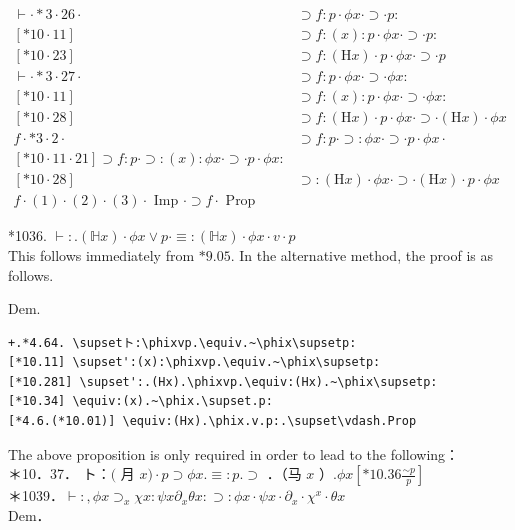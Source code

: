 \documentclass[10pt]{article}
\begin{document}
\[
\begin{array}{ll}
\vdash \cdot * 3 \cdot 26 \cdot & \supset f: p \cdot \phi x \cdot \supset \cdot p: \\
{[* 10 \cdot 11]} & \supset f:(x): p \cdot \phi x \cdot \supset \cdot p: \\
{[* 10 \cdot 23]} & \supset f:(\mathrm{H} x) \cdot p \cdot \phi x \cdot \supset \cdot p \\
\vdash \cdot * 3 \cdot 27 \cdot & \supset f: p \cdot \phi x \cdot \supset \cdot \phi x: \\
{[* 10 \cdot 11]} & \supset f:(x): p \cdot \phi x \cdot \supset \cdot \phi x: \\
{[* 10 \cdot 28]} & \supset f:(\mathrm{H} x) \cdot p \cdot \phi x \cdot \supset \cdot(\mathrm{H} x) \cdot \phi x \\
f \cdot * 3 \cdot 2 \cdot & \supset f: p \cdot \supset: \phi x \cdot \supset \cdot p \cdot \phi x \cdot \\
{[* 10 \cdot 11 \cdot 21] \supset f: p \cdot \supset:(x): \phi x \cdot \supset \cdot p \cdot \phi x:} \\
{[* 10 \cdot 28]} & \supset:(\mathrm{H} x) \cdot \phi x \cdot \supset \cdot(\mathrm{H} x) \cdot p \cdot \phi x  \tag{3}\\
f \cdot(1) \cdot(2) \cdot(3) \cdot \text { Imp } \cdot \supset f \cdot \text { Prop }
\end{array}
\]

*1036. $\vdash: .(\mathbb{H} x) \cdot \phi x \vee p \cdot \equiv:(\mathbb{H} x) \cdot \phi x \cdot v \cdot p$\\
This follows immediately from $* 9.05$. In the alternative method, the proof is as follows.

Dem.

\begin{verbatim}
+.*4.64. \supsetト:\phixvp.\equiv.~\phix\supsetp:
[*10.11] \supset':(x):\phixvp.\equiv.~\phix\supsetp:
[*10.281] \supset':.(Hx).\phixvp.\equiv:(Hx).~\phix\supsetp:
[*10.34] \equiv:(x).~\phix.\supset.p:
[*4.6.(*10.01)] \equiv:(Hx).\phix.v.p:.\supset\vdash.Prop
\end{verbatim}

The above proposition is only required in order to lead to the following：\\
＊10．37． ト：$($ 月 $x) \cdot p \supset \phi x . \equiv: p . \supset$ ．（马 $x$ ）.$\phi x\left[* 10.36 \frac{\sim p}{p}\right]$\\
＊1039．$\vdash:, \phi x \supset_{x} \chi x: \psi x \partial_{x} \theta x: \supset: \phi x \cdot \psi x \cdot \partial_{x} \cdot \chi^{x} \cdot \theta x$\\
Dem．
\end{document}
